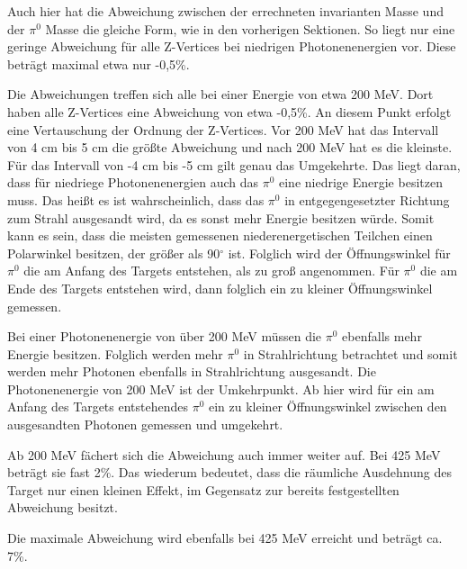 \documentclass[a4paper,11pt,oneside,final,german,openbib,pdftex]{scrbook}
\begin{document}
{Auch hier hat die Abweichung zwischen der errechneten invarianten Masse und der $\pi^0$ Masse die gleiche Form, wie in den vorherigen Sektionen. So liegt nur eine geringe Abweichung f\"ur alle Z-Vertices bei niedrigen Photonenenergien vor. Diese betr\"agt maximal etwa nur -0,5\%. 

Die Abweichungen treffen sich alle bei einer Energie von etwa 200 MeV. Dort haben alle Z-Vertices eine Abweichung von etwa -0,5\%. An diesem Punkt erfolgt eine Vertauschung der Ordnung der Z-Vertices. Vor 200 MeV hat das Intervall von 4 cm bis 5 cm die gr\"o{\ss}te Abweichung und nach 200 MeV hat es die kleinste. F\"ur das Intervall von -4 cm bis -5 cm gilt genau das Umgekehrte. Das liegt daran, dass f\"ur niedriege Photonenenergien auch das $\pi^0$ eine niedrige Energie besitzen muss. Das hei{\ss}t es ist wahrscheinlich, dass das $\pi^0$ in entgegengesetzter Richtung zum Strahl ausgesandt wird, da es sonst mehr Energie besitzen w\"urde. Somit kann es sein, dass die meisten gemessenen niederenergetischen Teilchen einen Polarwinkel besitzen, der gr\"o{\ss}er als 90$^{\circ}$ ist. Folglich wird der \"Offnungswinkel f\"ur $\pi^0$ die am Anfang des Targets entstehen, als zu gro{\ss} angenommen. F\"ur $\pi^0$ die am Ende des Targets entstehen wird, dann folglich ein zu kleiner \"Offnungswinkel gemessen. 

Bei einer Photonenenergie von \"uber 200 MeV m\"ussen die $\pi^0$ ebenfalls mehr Energie besitzen. Folglich werden mehr $\pi^0$ in Strahlrichtung betrachtet und somit werden mehr Photonen ebenfalls in Strahlrichtung ausgesandt. Die Photonenenergie von 200 MeV ist der Umkehrpunkt.
Ab hier wird f\"ur ein am Anfang des Targets entstehendes $\pi^0$ ein zu kleiner \"Offnungswinkel zwischen den ausgesandten Photonen gemessen und umgekehrt.

Ab 200 MeV f\"achert sich die Abweichung auch immer weiter auf. Bei 425 MeV betr\"agt sie fast 2\%. Das wiederum bedeutet, dass die r\"aumliche Ausdehnung des Target nur einen kleinen Effekt, im Gegensatz zur bereits festgestellten Abweichung besitzt.

Die maximale Abweichung wird ebenfalls bei 425 MeV erreicht und betr\"agt ca. 7\%.

}
\end{document}
